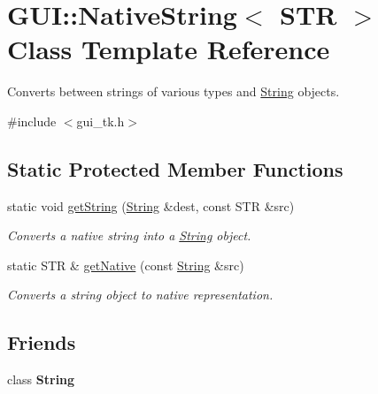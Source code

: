 \hypertarget{classGUI_1_1NativeString}{\section{G\-U\-I\-:\-:Native\-String$<$ S\-T\-R $>$ Class Template Reference}
\label{classGUI_1_1NativeString}
}


Converts between strings of various types and \hyperlink{classGUI_1_1String}{String} objects.  




{\ttfamily \#include $<$gui\-\_\-tk.\-h$>$}

\subsection*{Static Protected Member Functions}
\begin{DoxyCompactItemize}
\item 
\hypertarget{classGUI_1_1NativeString_a935e38aa7a2a11f821d1569059a74f3f}{static void \hyperlink{classGUI_1_1NativeString_a935e38aa7a2a11f821d1569059a74f3f}{get\-String} (\hyperlink{classGUI_1_1String}{String} \&dest, const S\-T\-R \&src)}\label{classGUI_1_1NativeString_a935e38aa7a2a11f821d1569059a74f3f}

\begin{DoxyCompactList}\small\item\em Converts a native string into a \hyperlink{classGUI_1_1String}{String} object. \end{DoxyCompactList}\item 
static S\-T\-R \& \hyperlink{classGUI_1_1NativeString_aebb6e74db39675d8f7348ecd882e0ef3}{get\-Native} (const \hyperlink{classGUI_1_1String}{String} \&src)
\begin{DoxyCompactList}\small\item\em Converts a string object to native representation. \end{DoxyCompactList}\end{DoxyCompactItemize}
\subsection*{Friends}
\begin{DoxyCompactItemize}
\item 
\hypertarget{classGUI_1_1NativeString_a7fb804f7dc96dd9f705c84095f37f1ca}{class {\bfseries String}}\label{classGUI_1_1NativeString_a7fb804f7dc96dd9f705c84095f37f1ca}

\end{DoxyCompactItemize}


